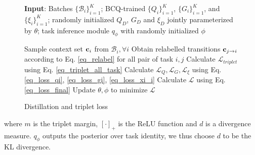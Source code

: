 \begin{figure}
    \begin{minipage}{0.5\textwidth}
    \begin{algorithm}[H]
        \caption{Distillation and triplet loss}\label{algo_mtbrl}
        {\bf Input}: Batches $\{\mathcal{B}_{i}\}_{i=1}^K$; BCQ-trained $\{Q_i\}^K_{i=1}$, $\{G_i\}^K_{i=1}$, and $\{\xi_i\}^K_{i=1}$; randomly initialized $Q_D$, $G_D$ and $\xi_D$ jointly parameterized by $\theta$; task inference module $q_\phi$ with randomly initialized $\phi$
        \begin{algorithmic}[1]
            \Repeat
            \State Sample context set ${\bf c}_i$ from $\mathcal{B}_{i}, \forall i$
            \State Obtain relabelled transitions ${\bf c}_{j\rightarrow i}$ according to Eq. \ref{eq_relabel} for all pair of task $i, j$
            \State Calculate $\mathcal{L}_{triplet}$ using Eq. \ref{eq_triplet_all_task}
            \State Calculate $\mathcal{L}_Q, \mathcal{L}_G, \mathcal{L}_\xi$ using Eq. \ref{eq_loss_qi}, \ref{eq_loss_gi}, \ref{eq_loss_xi_i}
            \State Calculate $\mathcal{L}$ using Eq. \ref{eq_loss_final}
            \State Update $\theta, \phi$ to minimize $\mathcal{L}$
        \end{algorithmic}
    \end{algorithm}
    \end{minipage}
\end{figure}


where $m$ is the triplet margin, $[\cdot]_{+}$ is the ReLU function and $d$ is a divergence measure. $q_\phi$ outputs the posterior over task identity, we thus choose $d$ to be the KL divergence.

